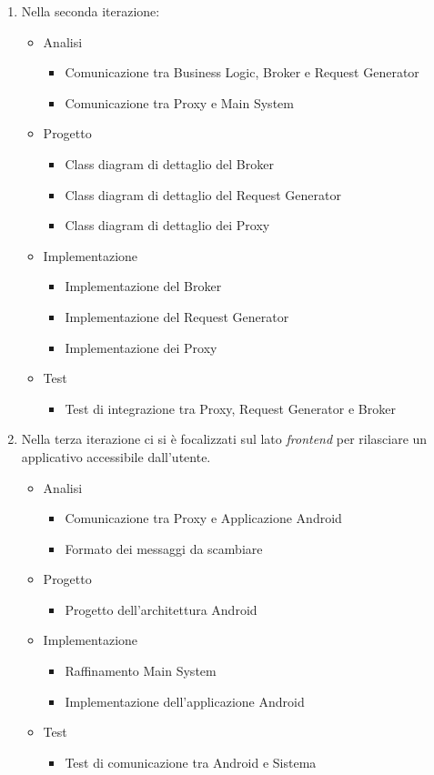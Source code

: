 \begin{enumerate}
	\item Nella seconda iterazione:
	\begin{itemize}
		\item Analisi
		\begin{itemize}
			\item Comunicazione tra Business Logic, Broker e Request Generator
			\item Comunicazione tra Proxy e Main System
		\end{itemize}
		\item Progetto
		\begin{itemize}
			\item Class diagram di dettaglio del Broker
			\item Class diagram di dettaglio del Request Generator
			\item Class diagram di dettaglio dei Proxy
		\end{itemize}
		\item Implementazione
		\begin{itemize}
			\item Implementazione del Broker
			\item Implementazione del Request Generator
			\item Implementazione dei Proxy
		\end{itemize}
		\item Test
		\begin{itemize}
			\item Test di integrazione tra Proxy, Request Generator e Broker
		\end{itemize}
	\end{itemize}
	\item Nella terza iterazione ci si è focalizzati sul lato \textit{frontend} per rilasciare un applicativo accessibile dall'utente.
		\begin{itemize}
			\item Analisi
			\begin{itemize}
				\item Comunicazione tra Proxy e Applicazione Android
				\item Formato dei messaggi da scambiare
			\end{itemize}
			\item Progetto
			\begin{itemize}
				\item Progetto dell'architettura Android
			\end{itemize}
			\item Implementazione
			\begin{itemize}
				\item Raffinamento Main System 
				\item Implementazione dell'applicazione Android
			\end{itemize}
			\item Test
			\begin{itemize}
				\item Test di comunicazione tra Android e Sistema
			\end{itemize}
		\end{itemize}
\end{enumerate}

